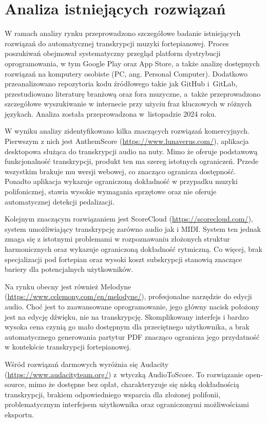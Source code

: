 \documentclass[a4paper,twoside,12pt]{book}
\begin{document}
\section{Analiza istniejących rozwiązań}

W ramach analizy rynku przeprowadzono szczegółowe badanie istniejących rozwiązań do automatycznej transkrypcji muzyki fortepianowej. Proces poszukiwań obejmował systematyczny przegląd platform dystrybucji oprogramowania, w tym Google Play oraz App Store, a także analizę dostępnych rozwiązań na komputery osobiste (PC, ang. Personal Computer). Dodatkowo przeanalizowano repozytoria kodu źródłowego takie jak GitHub i~GitLab, przestudiowano literaturę branżową oraz fora muzyczne, a~także przeprowadzono szczegółowe wyszukiwanie w internecie przy użyciu fraz kluczowych w różnych językach. Analiza została przeprowadzona w~listopadzie 2024 roku.

W wyniku analizy zidentyfikowano kilka znaczących rozwiązań komercyjnych. Pierwszym z nich jest AnthemScore (\small{\url{https://www.lunaverus.com/}}), aplikacja desktopowa służąca do transkrypcji audio na nuty. Mimo że oferuje podstawową funkcjonalność transkrypcji, produkt ten ma szereg istotnych ograniczeń. Przede wszystkim brakuje mu wersji webowej, co znacząco ogranicza dostępność. Ponadto aplikacja wykazuje ograniczoną dokładność w przypadku muzyki polifonicznej, stawia wysokie wymagania sprzętowe oraz nie oferuje automatycznej detekcji pedalizacji.

Kolejnym znaczącym rozwiązaniem jest ScoreCloud (\small{\url{https://scorecloud.com/}}), system umożliwiający transkrypcję zarówno audio jak i MIDI. System ten jednak zmaga się z istotnymi problemami w rozpoznawaniu złożonych struktur harmonicznych oraz wykazuje ograniczoną dokładność rytmiczną. Co więcej, brak specjalizacji pod fortepian oraz wysoki koszt subskrypcji stanowią znaczące bariery dla potencjalnych użytkowników.

Na rynku obecny jest również Melodyne (\small{\url{https://www.celemony.com/en/melodyne/}}), profesjonalne narzędzie do edycji audio. Choć jest to zaawansowane oprogramowanie, jego główny nacisk położony jest na edycję dźwięku, nie na transkrypcję. Skomplikowany interfejs i bardzo wysoka cena czynią go mało dostępnym dla przeciętnego użytkownika, a brak automatycznego generowania partytur PDF znacząco ogranicza jego przydatność w kontekście transkrypcji fortepianowej.

Wśród rozwiązań darmowych wyróżnia się Audacity (\small{\url{https://www.audacityteam.org/}}) z~wtyczką AudioToScore. To rozwiązanie open-source, mimo że dostępne bez opłat, charakteryzuje się niską dokładnością transkrypcji, brakiem odpowiedniego wsparcia dla złożonej polifonii, problematycznym interfejsem użytkownika oraz ograniczonymi możliwościami eksportu.
\end{document}
